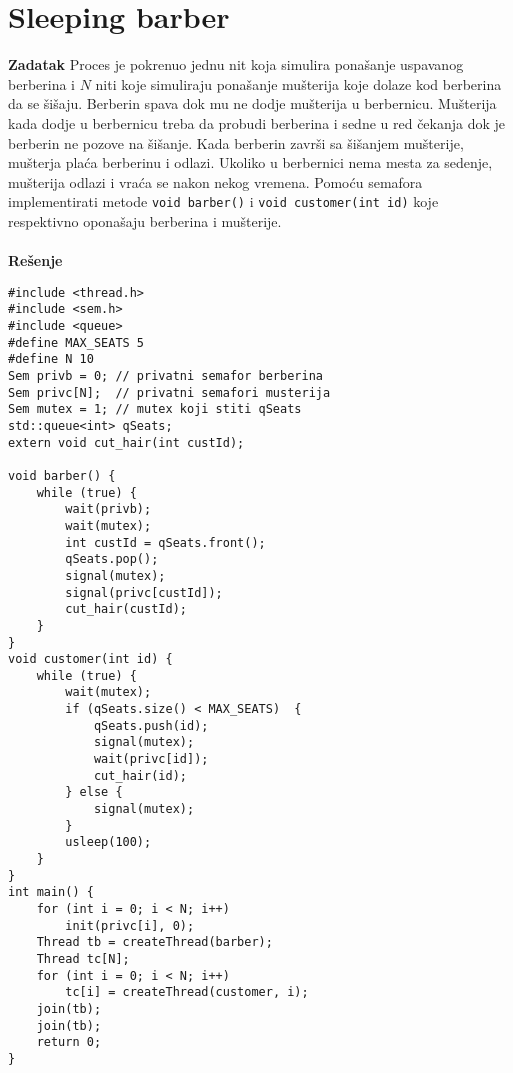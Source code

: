 \clearpage
\section{\latin Sleeping barber}
\textbf{\large Zadatak} Proces je pokrenuo jednu nit koja simulira pona\v{s}anje uspavanog berberina i $N$ niti koje simuliraju pona\v{s}anje mu\v{s}terija koje dolaze kod berberina da se \v{s}i\v{s}aju. Berberin spava dok mu ne dodje mu\v{s}terija u berbernicu. Mu\v{s}terija kada dodje u berbernicu treba da probudi berberina i sedne u red \v{c}ekanja dok je berberin ne pozove na \v{s}i\v{s}anje. Kada berberin zavr\v{s}i sa \v{s}i\v{s}anjem mu\v{s}terije, mu\v{s}terja pla\'{c}a berberinu i odlazi. Ukoliko u berbernici nema mesta za sedenje, mu\v{s}terija odlazi i vra\'{c}a se nakon nekog vremena. Pomo\'{c}u semafora implementirati metode \texttt{void barber()} i \texttt{void customer(int id)} koje respektivno opona\v{s}aju berberina i mu\v{s}terije.
\\\\
\textbf{\large Re\v{s}enje}
\begin{lstlisting}
#include <thread.h>
#include <sem.h>
#include <queue>
#define MAX_SEATS 5
#define N 10
Sem privb = 0; // privatni semafor berberina
Sem privc[N];  // privatni semafori musterija
Sem mutex = 1; // mutex koji stiti qSeats
std::queue<int> qSeats;
extern void cut_hair(int custId);

void barber() {
    while (true) {
        wait(privb);
        wait(mutex);
        int custId = qSeats.front();
        qSeats.pop();
        signal(mutex);
        signal(privc[custId]);
        cut_hair(custId);
    }
}
void customer(int id) {
    while (true) {
        wait(mutex);
        if (qSeats.size() < MAX_SEATS)  {
            qSeats.push(id);
            signal(mutex);
            wait(privc[id]);
            cut_hair(id);
        } else {
            signal(mutex);
        }
        usleep(100);
    }
}
int main() {
    for (int i = 0; i < N; i++) 
        init(privc[i], 0);
    Thread tb = createThread(barber);
    Thread tc[N];
    for (int i = 0; i < N; i++) 
        tc[i] = createThread(customer, i);
    join(tb);
    join(tb);
    return 0;
}

\end{lstlisting}
